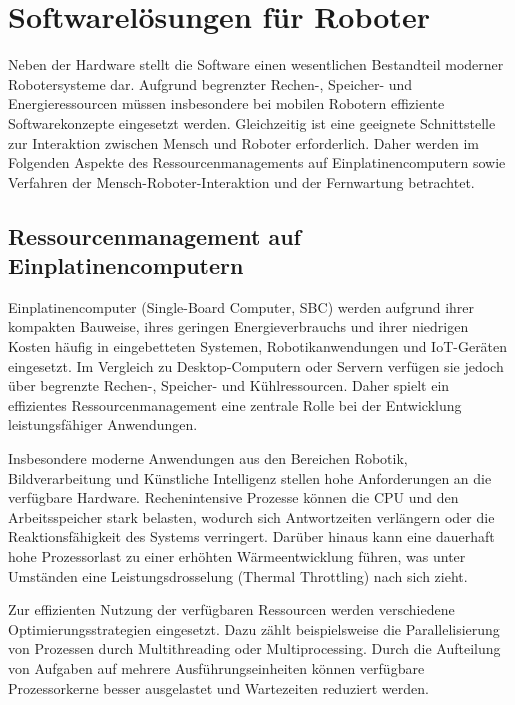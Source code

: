 \section{Softwarelösungen für Roboter}
\label{sec:Softwarelösungen}

Neben der Hardware stellt die Software einen wesentlichen Bestandteil moderner Robotersysteme dar. Aufgrund begrenzter Rechen-, Speicher- und Energieressourcen müssen insbesondere bei mobilen Robotern effiziente Softwarekonzepte eingesetzt werden. Gleichzeitig ist eine geeignete Schnittstelle zur Interaktion zwischen Mensch und Roboter erforderlich. Daher werden im Folgenden Aspekte des Ressourcenmanagements auf Einplatinencomputern sowie Verfahren der Mensch-Roboter-Interaktion und der Fernwartung betrachtet.
\subsection{Ressourcenmanagement auf Einplatinencomputern}

Einplatinencomputer (Single-Board Computer, SBC) werden aufgrund ihrer kompakten Bauweise, ihres geringen Energieverbrauchs und ihrer niedrigen Kosten häufig in eingebetteten Systemen, Robotikanwendungen und IoT-Geräten eingesetzt. Im Vergleich zu Desktop-Computern oder Servern verfügen sie jedoch über begrenzte Rechen-, Speicher- und Kühlressourcen. Daher spielt ein effizientes Ressourcenmanagement eine zentrale Rolle bei der Entwicklung leistungsfähiger Anwendungen. \cite{peckol2019embedded}

Insbesondere moderne Anwendungen aus den Bereichen Robotik, Bildverarbeitung und Künstliche Intelligenz stellen hohe Anforderungen an die verfügbare Hardware. Rechenintensive Prozesse können die CPU und den Arbeitsspeicher stark belasten, wodurch sich Antwortzeiten verlängern oder die Reaktionsfähigkeit des Systems verringert. Darüber hinaus kann eine dauerhaft hohe Prozessorlast zu einer erhöhten Wärmeentwicklung führen, was unter Umständen eine Leistungsdrosselung (Thermal Throttling) nach sich zieht. \cite{eang2024mec}

Zur effizienten Nutzung der verfügbaren Ressourcen werden verschiedene Optimierungsstrategien eingesetzt. Dazu zählt beispielsweise die Parallelisierung von Prozessen durch Multithreading oder Multiprocessing. Durch die Aufteilung von Aufgaben auf mehrere Ausführungseinheiten können verfügbare Prozessorkerne besser ausgelastet und Wartezeiten reduziert werden. \cite{patterson2020computer}

